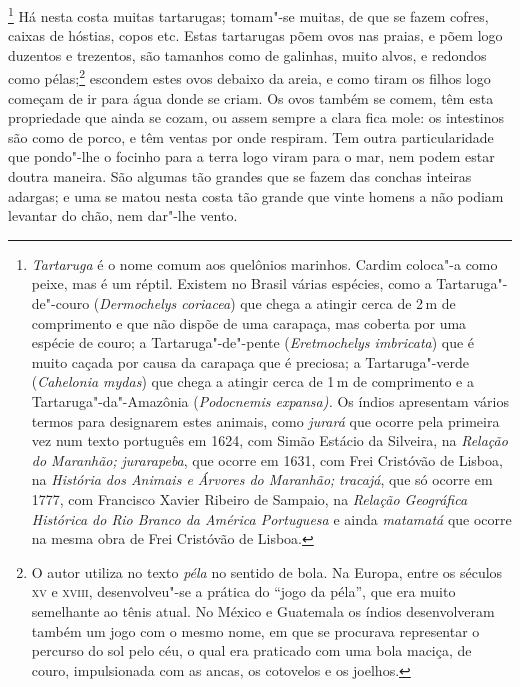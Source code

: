 \begin{linenumbers}
\footnote{ \textit{Tartaruga} é o nome comum aos
quelônios marinhos. Cardim coloca"-a como peixe, mas é um réptil.
Existem no Brasil várias espécies, como a Tartaruga"-de"-couro
(\textit{Dermochelys coriacea}) que chega a atingir cerca de 2\,m de
comprimento e que não dispõe de uma carapaça, mas coberta por uma
espécie de couro; a Tartaruga"-de"-pente (\textit{Eretmochelys
imbricata}) que é muito caçada por causa da carapaça que é preciosa; a
Tartaruga"-verde (\textit{Cahelonia mydas}) que chega a atingir cerca
de 1\,m de comprimento e a Tartaruga"-da"-Amazônia (\textit{Podocnemis
expansa).} Os índios apresentam vários termos para designarem estes
animais, como \textit{jurará} que ocorre pela primeira vez num texto
português em 1624, com Simão Estácio da Silveira, na \textit{Relação do
Maranhão;} \textit{jurarapeba}, que ocorre em 1631, com Frei Cristóvão
de Lisboa, na \textit{História dos Animais e Árvores do Maranhão;} 
\textit{tracajá}, que só ocorre em 1777, com Francisco Xavier Ribeiro
de Sampaio, na \textit{Relação Geográfica Histórica do Rio Branco da
América Portuguesa} e ainda \textit{matamatá} que ocorre na mesma obra
de Frei Cristóvão de Lisboa.} Há nesta costa muitas
tartarugas; tomam"-se muitas, de que se fazem cofres, caixas de hóstias,
copos etc. Estas tartarugas põem ovos nas praias, e põem logo duzentos
e trezentos, são tamanhos como de galinhas, muito alvos, e redondos
como pélas;\footnote{ O autor utiliza no texto \textit{péla} no sentido
de bola. Na Europa, entre os séculos \textsc{xv} e \textsc{xviii}, desenvolveu"-se a
prática do ``jogo da péla'', que era muito semelhante ao tênis atual. No
México e Guatemala os índios desenvolveram também um jogo com o mesmo
nome, em que se procurava representar o percurso do sol pelo céu, o
qual era praticado com uma bola maciça, de couro, impulsionada com as
ancas, os cotovelos e os joelhos.} escondem estes ovos debaixo da
areia, e como tiram os filhos logo começam de ir para água donde se
criam. Os ovos também se comem, têm esta propriedade que ainda se
cozam, ou assem sempre a clara fica mole: os intestinos são como de
porco, e têm ventas por onde respiram. Tem outra particularidade que
pondo"-lhe o focinho para a terra logo viram para o mar, nem podem
estar doutra maneira. São algumas tão grandes que se fazem das conchas
inteiras adargas; e uma se matou nesta costa tão grande que vinte
homens a não podiam levantar do chão, nem dar"-lhe vento.

\enlargethispage{\baselineskip}


\end{linenumbers}
